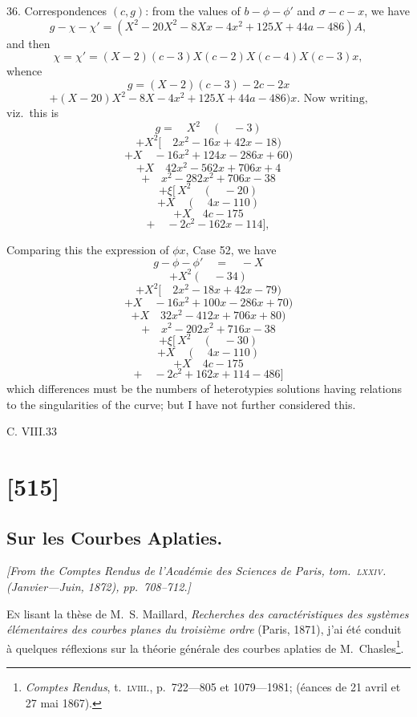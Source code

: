\documentclass[11pt,a4paper]{book}
\begin{document}
36.  Correspondences $(c, g)$: from the values of $b - \phi - \phi'$ and $\sigma - c - x$, we have
\[
g - \chi - \chi' = (X^2 - 20X^2 - 8Xx - 4x^2 + 125X + 44a - 486)A,
\]
and then
\[
\chi = \chi' = (X - 2)(c - 3)X(c - 2)X(c - 4)X(c - 3)x,
\]
whence
\[
g = (X - 2)(c - 3) - 2c - 2x
\]
\[
+ (X - 20)X^2 - 8X - 4x^2 + 125X + 44a - 486)x.  \text{ Now writing,}
\]
viz.\ this is
\[
g = \quad X^2 \quad ( \quad - 3)
\]
\[
+ X^2 [\quad 2x^2 - 16x + 42x - 18)
\]
\[
+ X \quad -16x^2 + 124x - 286x + 60)
\]
\[
+ X \quad 42x^2 - 562x + 706x + 4
\]
\[
+ \quad x^2 - 282x^2 + 706x - 38
\]
\[
+ \xi [\, X^2 \quad ( \quad - 20)
\]
\[
+ X \quad ( \quad 4x - 110)
\]
\[
+ X \quad 4c - 175
\]
\[
+ \quad -2c^2 - 162x - 114],
\]

Comparing this the expression of $\phi x$, Case 52, we have
\[
g - \phi - \phi' \quad = \quad - X
\]
\[
+ X^2 ( \quad - 34)
\]
\[
+ X^2 [ \quad 2x^2 - 18x + 42x - 79)
\]
\[
+ X \quad -16x^2 + 100x - 286x + 70)
\]
\[
+ X \quad 32x^2 - 412x + 706x + 80)
\]
\[
+ \quad x^2 - 202x^2 + 716x - 38
\]
\[
+ \xi [\, X^2 \quad ( \quad - 30)
\]
\[
+ X \quad ( \quad 4x - 110)
\]
\[
+ X \quad 4c - 175
\]
\[
+ \quad -2c^2 + 162x + 114 - 486]
\]
which differences must be the numbers of heterotypies solutions having relations to the
singularities of the curve; but I have not further considered this.

C. VIII.\hfill 33

\clearpage

\section{[515]}
\subsection{Sur les Courbes Aplaties.}

\begin{center}
\textit{[From the \textit{Comptes Rendus de l'Acad\'emie des Sciences de Paris}, tom.~\textsc{lxxiv}. (Janvier---Juin, 1872), pp.~708--712.]}
\end{center}

\textsc{En} lisant la th\`ese de M.~S. Maillard, \textit{Recherches des caract\'eristiques des syst\`emes
\'el\'ementaires des courbes planes du troisi\`eme ordre} (Paris, 1871), j'ai \'et\'e conduit \`a
quelques r\'eflexions sur la th\'eorie g\'en\'erale des courbes aplaties de M.~Chasles\footnote{\textit{Comptes Rendus}, t.~\textsc{lviii.}, p.~722---805 et 1079---1981; (\'eances de 21 avril et 27 mai 1867).}.
\end{document}
